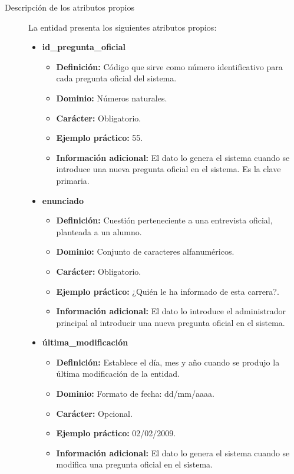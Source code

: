 \begin{description}
   \item[Descripción de los atributos propios] La entidad presenta los siguientes
   atributos propios:

   \begin{itemize}
    \item \textbf{id\_pregunta\_oficial}
      \begin{itemize}
         \item \textbf{Definición:} Código que sirve como número identificativo
               para cada pregunta oficial del sistema.
         \item \textbf{Dominio:} Números naturales.
         \item \textbf{Carácter:} Obligatorio.
         \item \textbf{Ejemplo práctico:} 55.
         \item \textbf{Información adicional:} El dato lo genera el sistema
               cuando se introduce una nueva pregunta oficial en el sistema. Es
               la clave primaria.
      \end{itemize}
   \item \textbf{enunciado}
      \begin{itemize}
         \item \textbf{Definición:} Cuestión perteneciente a una entrevista
         oficial, planteada a un alumno.
         \item \textbf{Dominio:} Conjunto de caracteres alfanuméricos.
         \item \textbf{Carácter:} Obligatorio.
         \item \textbf{Ejemplo práctico:} ¿Quién le ha informado de esta
         carrera?.
         \item \textbf{Información adicional:} El dato lo introduce el
         administrador principal al introducir una nueva pregunta oficial en el
         sistema.
      \end{itemize}
    \item \textbf{última\_modificación}
      \begin{itemize}
         \item \textbf{Definición:} Establece el día, mes y año cuando se
            produjo la última modificación de la entidad.
         \item \textbf{Dominio:} Formato de fecha: dd/mm/aaaa.
         \item \textbf{Carácter:} Opcional.
         \item \textbf{Ejemplo práctico:} 02/02/2009.
         \item \textbf{Información adicional:} El dato lo genera el sistema
               cuando se modifica una pregunta oficial en el sistema.
      \end{itemize}
   \end{itemize}


\end{description}
